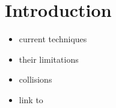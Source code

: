 % 	
%
% 
\section{Introduction}
\cite{Balls2009}
% 
\begin{itemize}
    \item current techniques
    \item their limitations
    \item collisions
    \item link to \cite{matuschke2019}
\end{itemize}
% 
